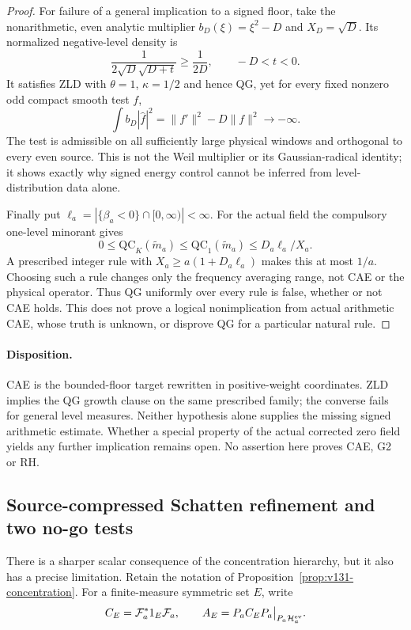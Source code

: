 \documentclass[11pt]{article}
\theoremstyle{remark}
\begin{document}
\begin{proof}
For failure of a general implication to a signed floor, take the
nonarithmetic, even analytic multiplier $b_D(\xi)=\xi^2-D$ and
$X_D=\sqrt D$. Its normalized negative-level density is
\[
 \frac{1}{2\sqrt D\sqrt{D+t}}\ge\frac1{2D},
              \qquad -D<t<0.
\]
It satisfies ZLD with $\theta=1$, $\kappa=1/2$ and hence QG, yet
for every fixed nonzero odd compact smooth test $f$,
\[
 \int b_D|\widehat f|^2=\|f'\|^2-D\|f\|^2\longrightarrow-\infty.
\]
The test is admissible on all sufficiently large physical windows
and orthogonal to every even source. This is not the Weil multiplier
or its Gaussian-radical identity; it shows exactly why signed
energy control cannot be inferred from level-distribution data alone.

Finally put $\ell_a=|\{\beta_a<0\}\cap[0,\infty)|<\infty$.
For the actual field the compulsory one-level minorant gives
\begin{equation}\label{eq:v151-cutoff-dilution}
 0\le\mathrm{QC}_K(\widetilde m_a)
 \le\mathrm{QC}_1(\widetilde m_a)\le D_a\ell_a/X_a.
\end{equation}
A prescribed integer rule with $X_a\ge a(1+D_a\ell_a)$ makes
this at most $1/a$. Choosing such a rule changes only the frequency
averaging range, not CAE or the physical operator. Thus QG uniformly over every rule is false, whether or not CAE
holds. This does not prove a logical nonimplication from actual
arithmetic CAE, whose truth is unknown, or disprove QG for a
particular natural rule.
\end{proof}

\paragraph{Disposition.}
CAE is the bounded-floor target rewritten in positive-weight coordinates.
ZLD implies the QG growth clause on the same prescribed family; the
converse fails for general level measures. Neither hypothesis alone
supplies the missing signed arithmetic estimate. Whether a special
property of the actual corrected zero field yields any further
implication remains open. No assertion here proves CAE, G2 or RH.


\subsection*{Source-compressed Schatten refinement and two no-go tests}

There is a sharper scalar consequence of the concentration hierarchy,
but it also has a precise limitation. Retain the notation of
Proposition~\ref{prop:v131-concentration}. For a finite-measure
symmetric set $E$, write
\[
 C_E=\mathcal F_a^*1_E\mathcal F_a,
 \qquad A_E=P_aC_EP_a\big|_{P_a\mathcal H_a^{\rm ev}}.
\]
\end{document}
